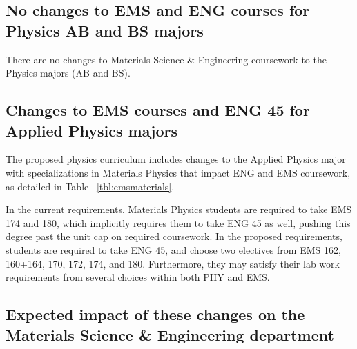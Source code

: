 \documentclass[12pt]{article}
\begin{document}
\subsection{No changes to EMS and ENG courses for Physics AB and BS majors}

There are no changes to Materials Science \& Engineering coursework
to the Physics majors (AB and BS).

\subsection{Changes to EMS courses and ENG 45 for Applied Physics majors}

The proposed physics curriculum includes changes to the Applied
Physics major with specializations in Materials Physics that impact
ENG and EMS coursework, as detailed in Table~ \ref{tbl:emsmaterials}.

In the current requirements, Materials Physics students are required
to take EMS 174 and 180, which implicitly requires them to take ENG 45
as well, pushing this degree past the unit cap on required coursework.
In the proposed requirements, students are required to take ENG 45,
and choose two electives from EMS 162, 160+164, 170, 172, 174, and
180.  Furthermore, they may satisfy their lab work requirements from
several choices within both PHY and EMS.

\subsection{Expected impact of these changes on the Materials Science \& Engineering department}
\end{document}
